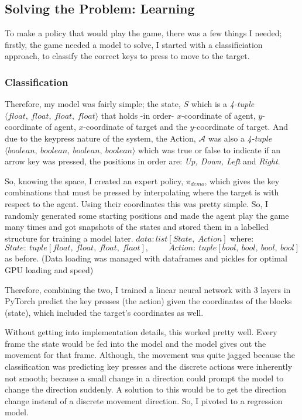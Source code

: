 \subsection{Solving the Problem: Learning}
To make a policy that would play the game, there was a few things I needed; firstly, the game needed a model to solve, I started with a classificiation approach, to classify the correct keys to press to move to the target.


\subsubsection{Classification}
Therefore, my model was fairly simple; the state, $S$ which is a \emph{4-tuple} $\langle float,~float,~float,~float \rangle$ that holds -in order- $x$-coordinate of agent, $y$-coordinate of agent, $x$-coordinate of target and the $y$-coordinate of target. And due to the keypress nature of the system, the Action, $\mathcal{A}$ was also a \emph{4-tuple} $\langle boolean,~boolean,~boolean,~boolean \rangle$ which was true or false to indicate if an arrow key was pressed, the positions in order are: \emph{Up, Down, Left} and \emph{Right}.

So, knowing the space, I created an expert policy, \(\pi_{demo}\), which gives the key combinations that must be pressed by interpolating where the target is with respect to the agent. Using their coordinates this was pretty simple. So, I randomly generated some starting positions and made the agent play the game many times and got snapshots of the states and stored them in a labelled structure for training a model later. \(data: list\left[State,~Action\right]\) where:
\[
  State:~tuple\left[float,~float,~float,~flaot\right], 
  \hspace{1cm} Action:~tuple\left[bool,~bool,~bool,~bool\right]
\]
as before. (Data loading was managed with dataframes and pickles for optimal GPU loading and speed)

Therefore, combining the two, I trained a linear neural network with 3 layers in PyTorch \cite{pytorch} predict the key presses (the action) given the coordinates of the blocks (state), which included the target's coordinates as well.

Without getting into implementation details, this worked pretty well. Every frame the state would be fed into the model and the model gives out the movement for that frame. Although, the movement was quite jagged because the classification was predicting key presses and the discrete actions were inherently not smooth; because a small change in a direction could prompt the model to change the  direction suddenly. A solution to this would be to get the direction change instead of a discrete movement direction. So, I pivoted to a regression model.

